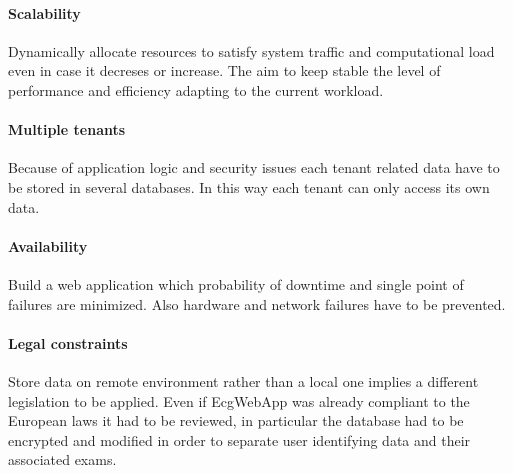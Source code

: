 \paragraph{Scalability}
Dynamically allocate resources to satisfy system traffic and computational load even in case it decreses or increase. The aim to keep stable the level of performance and efficiency adapting to the current workload.\\
\paragraph{Multiple tenants}
Because of application logic and security issues each tenant related data have to be stored in several databases. In this way each tenant can only access its own data.
\paragraph{Availability}
Build a web application which probability of downtime and single point of failures are minimized. Also hardware and network failures have to be prevented.

\paragraph{Legal constraints}
Store data on remote environment rather than a local one implies a different legislation to be applied. Even if EcgWebApp was already compliant to the European laws it had to be reviewed, in particular the database had to be encrypted and modified in order to separate user identifying data and their associated exams.



